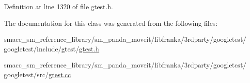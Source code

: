 Definition at line 1320 of file gtest.\+h.



The documentation for this class was generated from the following files\+:\begin{DoxyCompactItemize}
\item 
smacc\+\_\+sm\+\_\+reference\+\_\+library/sm\+\_\+panda\+\_\+moveit/libfranka/3rdparty/googletest/googletest/include/gtest/\hyperlink{gtest_8h}{gtest.\+h}\item 
smacc\+\_\+sm\+\_\+reference\+\_\+library/sm\+\_\+panda\+\_\+moveit/libfranka/3rdparty/googletest/googletest/src/\hyperlink{gtest_8cc}{gtest.\+cc}\end{DoxyCompactItemize}
